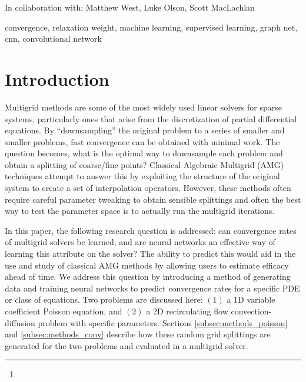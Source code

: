 \documentclass[review]{siamart190516}
\author{\TheName\thanks{\TheAddress}}
\title{{\TheTitle}}
\newcommand{\TheCollaborators}{%
  Matthew West,
  Luke Olson,
  Scott MacLachlan
}
\begin{document}
\maketitle

\begin{center}
In collaboration with:
  {\TheCollaborators}
\end{center}
\vspace{1cm}

\begin{abstract}
  
\end{abstract}

\begin{keywords}
  convergence, relaxation weight, machine learning, supervised learning, graph net, cnn, convolutional network
\end{keywords}

\section{Introduction}\label{sec:intro}

Multigrid methods are some of the most widely used linear solvers for sparse systems, particularly ones that arise from the discretization of partial differential equations.  By ``downsampling'' the original problem to a series of smaller and smaller problems, fast convergence can be obtained with minimal work\cite{mgtut}.  The question becomes, what is the optimal way to downsample each problem and obtain a splitting of coarse/fine points?  Classical Algebraic Multigrid (AMG) techniques attempt to answer this by exploiting the structure of the original system to create a set of interpolation operators\cite{rs}.  However, these methods often require careful parameter tweaking to obtain sensible splittings and often the best way to test the parameter space is to actually run the multigrid iterations.

In this paper, the following research question is addressed: can convergence rates of multigrid solvers be learned, and are neural networks an effective way of learning this attribute on the solver?  The ability to predict this would aid in the use and study of classical AMG methods by allowing users to estimate efficacy ahead of time.  We address this question by introducing a method of generating data and training neural networks to predict convergence rates for a specific PDE or class of equations.  Two problems are discussed here: $(1)$ a 1D variable coefficient Poisson equation, and $(2)$ a 2D recirculating flow convection-diffusion problem with specific parameters.  Sections \ref{subsec:methods_poisson} and \ref{subsec:methods_conv} describe how these random grid splittings are generated for the two problems and evaluated in a multigrid solver.
\end{document}
